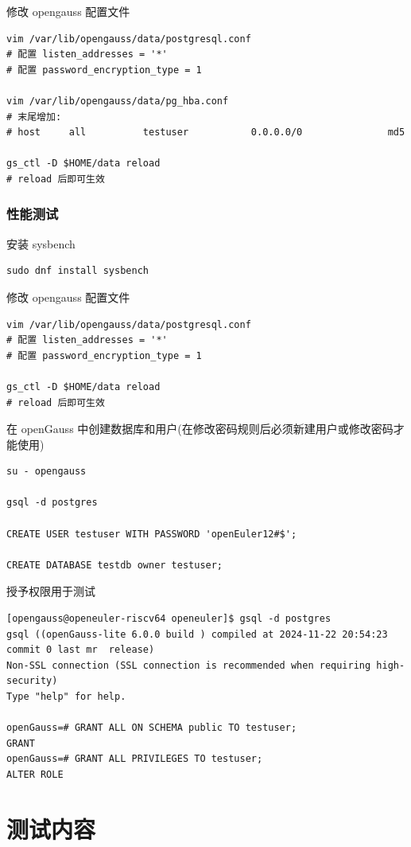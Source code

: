 \documentclass{article}
\begin{document}
修改 opengauss 配置文件
\begin{verbatim}
vim /var/lib/opengauss/data/postgresql.conf
# 配置 listen_addresses = '*'
# 配置 password_encryption_type = 1

vim /var/lib/opengauss/data/pg_hba.conf
# 末尾增加: 
# host     all          testuser           0.0.0.0/0               md5

gs_ctl -D $HOME/data reload
# reload 后即可生效
\end{verbatim}

\subsubsection{性能测试}

安装 sysbench
\begin{verbatim}
sudo dnf install sysbench
\end{verbatim}

修改 opengauss 配置文件
\begin{verbatim}
vim /var/lib/opengauss/data/postgresql.conf
# 配置 listen_addresses = '*'
# 配置 password_encryption_type = 1

gs_ctl -D $HOME/data reload
# reload 后即可生效
\end{verbatim}

在 openGauss 中创建数据库和用户(在修改密码规则后必须新建用户或修改密码才能使用)
\begin{verbatim}
su - opengauss

gsql -d postgres

CREATE USER testuser WITH PASSWORD 'openEuler12#$';

CREATE DATABASE testdb owner testuser;
\end{verbatim}

授予权限用于测试

\begin{verbatim}
[opengauss@openeuler-riscv64 openeuler]$ gsql -d postgres
gsql ((openGauss-lite 6.0.0 build ) compiled at 2024-11-22 20:54:23 commit 0 last mr  release)
Non-SSL connection (SSL connection is recommended when requiring high-security)
Type "help" for help.

openGauss=# GRANT ALL ON SCHEMA public TO testuser;
GRANT
openGauss=# GRANT ALL PRIVILEGES TO testuser; 
ALTER ROLE
\end{verbatim}


\section{测试内容}
\end{document}
